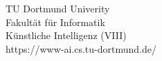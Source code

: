 \begin{titlepage}
\vspace*{2.5cm}
\hspace*{\links}
\begin{minipage}[b]{8cm}
\raggedright
TU Dortmund Univerity \\
Fakult\"at f\"ur Informatik\\
Künstliche Intelligenz (VIII)\\
https://www-ai.cs.tu-dortmund.de/
\end{minipage}

\end{titlepage}
